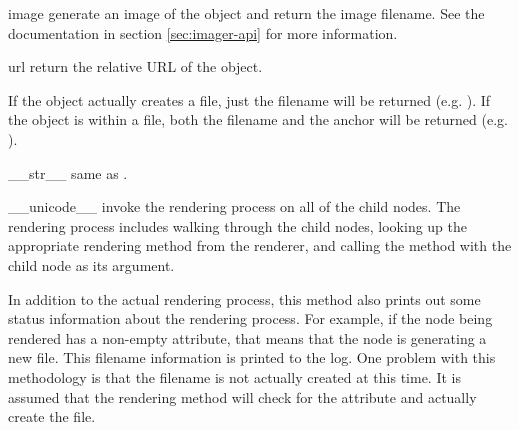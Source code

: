 \begin{memberdesc}[Renderable]{image}
generate an image of the object and return the image filename.  See
the  documentation in section \ref{sec:imager-api} for
more information.
\end{memberdesc}

\begin{memberdesc}[Renderable]{url}
return the relative URL of the object.  

If the object actually creates a file, just the filename will
be returned (e.g. ).  If the object is within a file, 
both the filename and the anchor will be returned 
(e.g. ).
\end{memberdesc}


\begin{methoddesc}[Renderable]{__str__}{}
same as .
\end{methoddesc}

\begin{methoddesc}[Renderable]{__unicode__}{}
invoke the rendering process on all of the child nodes.  The rendering process
includes walking through the child nodes, looking up the appropriate 
rendering method from the renderer, and calling the method with the child
node as its argument.

In addition to the actual rendering process, this method also prints out 
some status information about the rendering process.  For example, if 
the node being rendered has a non-empty  attribute, that
means that the node is generating a new file.  This filename information
is printed to the log.  One problem with this methodology is that the 
filename is not actually created at this time.  It is assumed that the
rendering method will check for the  attribute and actually
create the file.
\end{methoddesc}


